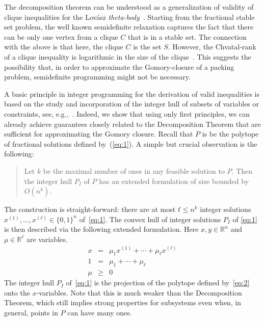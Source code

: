 \documentclass[11pt]{article}
\theoremstyle{remark}
\begin{document}
The decomposition theorem can be understood as a generalization of  validity of clique inequalities for the Lovász \emph{theta-body}~\cite{lovasz1979shannon}. Starting from the fractional stable set problem,  the well known semidefinite relaxation captures the fact that there can be only one vertex from a clique  $C$ that is in a stable set. The connection with the above is that here, the clique $C$ is the set $S$. However, the Chvatal-rank of a clique inequality is logarithmic in the size of the clique~\cite{ChvatalCookHartmann89}. This suggests the possibility that, in order to approximate the Gomory-closure of a packing problem, semidefinite programming might not be necessary. 


A basic principle in integer programming for the derivation of valid inequalities is based on the study and incorporation of the integer hull of subsets of variables or constraints, see, e.g.,~\cite{Gomory67,NemhauserWolsey88,conforti2014integer}. 
Indeed, we show that using only first principles, we can already achieve
guarantees closely related to the Decomposition Theorem that are sufficient for approximating the Gomory closure. Recall that  $P$ is be the polytope of fractional solutions defined by~(\ref{eq:1}). 
A simple but crucial observation is the following:
\begin{quote}
  Let $k$ be the maximal number of ones in any feasible solution to $P$.
	Then the integer hull $P_I$ of $P$ has an extended formulation of size bounded by $O(n^{k})$. 
\end{quote}
The construction is straight-forward: there are at most $ℓ≤ n^k$ integer solutions 
 $x^{(1)},\dots,x^{(ℓ)} ∈ \{0,1\}^n$ of~\eqref{eq:1}. The convex hull of integer solutions $P_I$ of \eqref{eq:1} is then described via the following extended formulation. Here  $x,y ∈ ℝ^n$ and $μ ∈ ℝ^ℓ$ are variables. 
\begin{equation}
  \label{eq:2}
  \begin{array}{lcl} 
    x& = & μ_1 x^{(1)} + \cdots + μ_ℓ x^{(ℓ)} \\
    1 &= &   μ_1  + \cdots + μ_ℓ  \\
    μ & ≥ & 0
  \end{array}
\end{equation}
The integer hull $P_I$ of~\eqref{eq:1} is the projection of the polytope defined by~\eqref{eq:2} onto the $x$-variables.
Note that this is much weaker than the Decomposition Theorem, which still implies strong properties for
subsystems even when, in general, points in $P$ can have many ones. 
\end{document}
